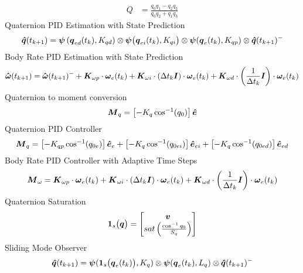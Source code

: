 \begin{nomenclature}
\begin{equation}
\begin{aligned}
    Q &= \frac{q_{0}q_{1} - q_{2}q_{3}}{q_{0}q_{2} + q_{1}q_{3}}
  \end{aligned}
\end{equation}
Quaternion PID Estimation with State Prediction
\begin{equation}
  \boldsymbol{\hat{q}}(t_{k+1}) = \boldsymbol{\psi}\left(\boldsymbol{q}_{ed}(t_k), K_{qd}\right) \otimes \boldsymbol{\psi}\big(\boldsymbol{q}_{ei}(t_k), K_{qi}\big) \otimes \boldsymbol{\psi}(\boldsymbol{q}_e(t_{k}), K_{qp})  \otimes \boldsymbol{\hat{q}}(t_{k+1})^-
\end{equation}
Body Rate PID Estimation with State Prediction
\begin{equation}
  \boldsymbol{\hat{\omega}}(t_{k+1}) = \boldsymbol{\hat{\omega}}(t_{k+1})^- + \boldsymbol{K}_{\omega p} \cdot \boldsymbol{\omega}_e(t_{k}) + \boldsymbol{K}_{\omega i} \cdot (\Delta t_k \boldsymbol{I})\cdot \boldsymbol{\omega}_e(t_{k}) + \boldsymbol{K}_{\omega d} \cdot \left(\frac{1}{\Delta t_k} \boldsymbol{I}\right) \cdot \boldsymbol{\omega}_e(t_{k})
\end{equation}
Quaternion to moment conversion\\
\begin{equation} \boldsymbol{M}_{q} = \left[- K_{q} \cos^{-1} (q_{0}) \right] \boldsymbol{\hat{e}} \end{equation}
Quaternion PID Controller \\
\begin{equation} \boldsymbol{M}_{q} = \left[- K_{qp} \cos^{-1} (q_{0e}) \right] \boldsymbol{\hat{e}}_e + \left[- K_{q} \cos^{-1} (q_{0ei}) \right] \boldsymbol{\hat{e}}_{ei} + \left[- K_{q} \cos^{-1} (q_{0ed}) \right] \boldsymbol{\hat{e}}_{ed} \end{equation}
Body Rate PID Controller with Adaptive Time Steps\\
\begin{equation}\boldsymbol{M}_{\omega} = \boldsymbol{K}_{\omega p} \cdot \boldsymbol{\omega}_e(t_{k}) + \boldsymbol{K}_{\omega i} \cdot (\Delta t_k \boldsymbol{I})\cdot \boldsymbol{\omega}_e(t_{k}) + \boldsymbol{K}_{\omega d} \cdot \left(\frac{1}{\Delta t_k} \boldsymbol{I}\right) \cdot \boldsymbol{\omega}_e(t_{k})\end{equation}
Quaternion Saturation
\begin{equation} \boldsymbol{1}_s\big(\boldsymbol{q} \big) = \begin{bmatrix} \boldsymbol{v} \\ sat\left( \frac{\cos^{-1} q_{0} }{S_{q}} \right) \end{bmatrix} \end{equation}
Sliding Mode Observer \\
\begin{subequations}
  \begin{align}
    \bs{\hat{q}}(t_{k+1}) &= \bs{\psi} (\bs{1}_s\big(\bs{q}_{e}(t_k)\big), K_q) \otimes \bs{\psi}(\bs{q}_e(t_{k}), L_{q})  \otimes \bs{\hat{q}}(t_{k+1})^- \\

\end{align}
\end{subequations}
\end{nomenclature}

